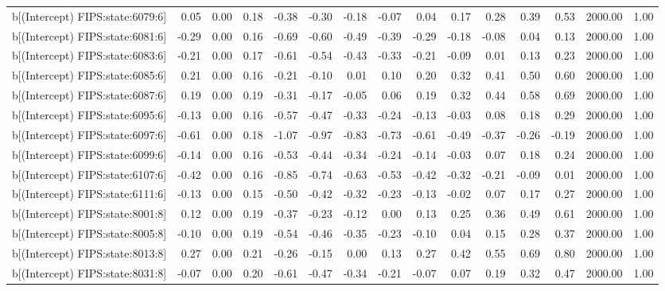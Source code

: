 \begin{table}[ht]
\begin{tabular}{rrrrrrrrrrrrrrr}
  b[(Intercept) FIPS:state:6079:6] & 0.05 & 0.00 & 0.18 & -0.38 & -0.30 & -0.18 & -0.07 & 0.04 & 0.17 & 0.28 & 0.39 & 0.53 & 2000.00 & 1.00 \\ 
  b[(Intercept) FIPS:state:6081:6] & -0.29 & 0.00 & 0.16 & -0.69 & -0.60 & -0.49 & -0.39 & -0.29 & -0.18 & -0.08 & 0.04 & 0.13 & 2000.00 & 1.00 \\ 
  b[(Intercept) FIPS:state:6083:6] & -0.21 & 0.00 & 0.17 & -0.61 & -0.54 & -0.43 & -0.33 & -0.21 & -0.09 & 0.01 & 0.13 & 0.23 & 2000.00 & 1.00 \\ 
  b[(Intercept) FIPS:state:6085:6] & 0.21 & 0.00 & 0.16 & -0.21 & -0.10 & 0.01 & 0.10 & 0.20 & 0.32 & 0.41 & 0.50 & 0.60 & 2000.00 & 1.00 \\ 
  b[(Intercept) FIPS:state:6087:6] & 0.19 & 0.00 & 0.19 & -0.31 & -0.17 & -0.05 & 0.06 & 0.19 & 0.32 & 0.44 & 0.58 & 0.69 & 2000.00 & 1.00 \\ 
  b[(Intercept) FIPS:state:6095:6] & -0.13 & 0.00 & 0.16 & -0.57 & -0.47 & -0.33 & -0.24 & -0.13 & -0.03 & 0.08 & 0.18 & 0.29 & 2000.00 & 1.00 \\ 
  b[(Intercept) FIPS:state:6097:6] & -0.61 & 0.00 & 0.18 & -1.07 & -0.97 & -0.83 & -0.73 & -0.61 & -0.49 & -0.37 & -0.26 & -0.19 & 2000.00 & 1.00 \\ 
  b[(Intercept) FIPS:state:6099:6] & -0.14 & 0.00 & 0.16 & -0.53 & -0.44 & -0.34 & -0.24 & -0.14 & -0.03 & 0.07 & 0.18 & 0.24 & 2000.00 & 1.00 \\ 
  b[(Intercept) FIPS:state:6107:6] & -0.42 & 0.00 & 0.16 & -0.85 & -0.74 & -0.63 & -0.53 & -0.42 & -0.32 & -0.21 & -0.09 & 0.01 & 2000.00 & 1.00 \\ 
  b[(Intercept) FIPS:state:6111:6] & -0.13 & 0.00 & 0.15 & -0.50 & -0.42 & -0.32 & -0.23 & -0.13 & -0.02 & 0.07 & 0.17 & 0.27 & 2000.00 & 1.00 \\ 
  b[(Intercept) FIPS:state:8001:8] & 0.12 & 0.00 & 0.19 & -0.37 & -0.23 & -0.12 & 0.00 & 0.13 & 0.25 & 0.36 & 0.49 & 0.61 & 2000.00 & 1.00 \\ 
  b[(Intercept) FIPS:state:8005:8] & -0.10 & 0.00 & 0.19 & -0.54 & -0.46 & -0.35 & -0.23 & -0.10 & 0.04 & 0.15 & 0.28 & 0.37 & 2000.00 & 1.00 \\ 
  b[(Intercept) FIPS:state:8013:8] & 0.27 & 0.00 & 0.21 & -0.26 & -0.15 & 0.00 & 0.13 & 0.27 & 0.42 & 0.55 & 0.69 & 0.80 & 2000.00 & 1.00 \\ 
  b[(Intercept) FIPS:state:8031:8] & -0.07 & 0.00 & 0.20 & -0.61 & -0.47 & -0.34 & -0.21 & -0.07 & 0.07 & 0.19 & 0.32 & 0.47 & 2000.00 & 1.00 \\ 

\end{tabular}
\end{table}
